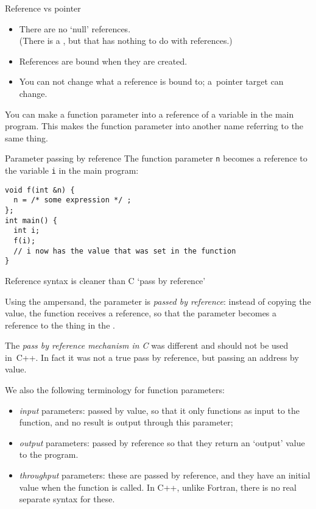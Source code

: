 \begin{slide}{Reference vs pointer}
  \label{sl:ref-vs-ptr}
  \begin{itemize}
  \item There are no `null' references.\\
    (There is a , but that has nothing to do with references.)
  \item References are bound when they are created.
  \item You can not change what a reference is bound to;\slidebreak
    a~pointer target can change.
  \end{itemize}
\end{slide}

You can make a function parameter into a reference of a variable in
the main program. This makes the function parameter into another name referring
to the same thing.

\begin{block}{Parameter passing by reference}
  \label{sl:pass-by-ref}
The function parameter \lstinline{n} becomes a reference to the variable \lstinline{i}
in the main program:
\begin{lstlisting}
void f(int &n) {
  n = /* some expression */ ;
};
int main() {
  int i;
  f(i);
  // i now has the value that was set in the function
}
\end{lstlisting}
 Reference syntax is cleaner than C `pass by reference'
\end{block}

Using the ampersand, the parameter is
\emph{passed by reference}:
instead of copying the value, the function receives a reference,
so that the parameter becomes a reference to the thing
in the .

\begin{remark}
  The \emph{pass by reference mechanism in C}%
  was different and should not be used in~C++. In fact it was not a
  true pass by reference, but passing an address by value.
\end{remark}

We also the following terminology for function parameters:
\begin{itemize}
\item \emph{input} parameters: passed by
  value, so that it only functions as input to the function, and no
  result is output through this parameter;
\item \emph{output} parameters: passed
  by reference so that they return an `output' value to the program.
\item \emph{throughput} parameters:
  these are passed by reference, and they have an initial value when
  the function is called. In C++, unlike Fortran, there is no real
  separate syntax for these.
\end{itemize}

